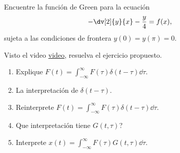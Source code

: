 \begin{ejercicio}
	Encuentre la función de Green para la ecuación
		$$ -\dv[2]{y}{x} - \frac{y}{4} = f(x), $$
	sujeta a las condiciones de frontera $y(0) = y(\pi) = 0$.
\end{ejercicio}






















\begin{ejercicio}
	Visto el video \href{https://youtu.be/ism2SfZgFJg?si=Mi-57CoReH2CGW91}{video}, resuelva el ejercicio propuesto.
	\begin{enumerate}
		\item Explique $F(t) = \int _{-\infty} ^\infty F(\tau) \delta (t - \tau) \dd{\tau}$.
		\item La interpretación de $\delta (t - \tau)$.
		\item Reinterprete $F(t) = \int _{-\infty} ^\infty F(\tau) \delta (t - \tau) \dd{\tau}$.
		\item Que interpretación tiene $G(t,\tau)$?
		\item Interprete $x(t) = \int _{-\infty} ^\infty F(\tau) G(t,\tau) \dd{\tau}$.
	\end{enumerate}
\end{ejercicio}






























